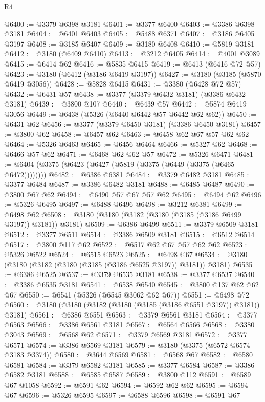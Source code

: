 \begin{lexlean}{R4}
\begin{coremodule}
@6400 := @3379 @6398 @3181
@6401 := @3377 @6400
@6403 := @3386 @6398 @3181
@6404 := @6401 @6403
@6405 := @5488 @6371
@6407 := @3186 @6405 @3197
@6408 := @3185 @6407
@6409 := @3180 @6408
@6410 := @5819 @3181
@6412 := @3180 (@6409 @6410)
@6413 := @3212 @6405
@6414 := @4001 @3089
@6415 := @6414 @62
@6416 := @5835 @6415
@6419 := @6413 (@6416 @72 @57)
@6423 := @3180 (@6412 (@3186 @6419 @3197))
@6427 := @3180 (@3185 (@5870 @6419 @3056))
@6428 := @5828 @6415
@6431 := @3380 (@6428 @72 @57)
@6432 := @6431 @57
@6438 := @3377 (@3379 @6432 @3181) (@3386 @6432 @3181)
@6439 := @3800 @107
@6440 := @6439 @57
@6442 := @5874 @6419 @3056
@6449 := @6438 (@5326 (@6440 @6442 @57 @6442 @62 @62))
@6450 := @6431 @62
@6456 := @3377 (@3379 @6450 @3181) (@3386 @6450 @3181)
@6457 := @3800 @62
@6458 := @6457 @62
@6463 := @6458 @62 @67 @57 @62 @62
@6464 := @5326 @6463
@6465 := @6456 @6464
@6466 := @5327 @62
@6468 := @6466 @57 @62
@6471 := @6468 @62 @62 @57
@6472 := @5326 @6471
@6481 := @6404 (@3375 (@6423 (@6427 (@5819 (@3375 (@6449 (@3375 (@6465 @6472))))))))
@6482 := @6386 @6381
@6484 := @3379 @6482 @3181
@6485 := @3377 @6484
@6487 := @3386 @6482 @3181
@6488 := @6485 @6487
@6490 := @3800 @67 @62
@6494 := @6490 @57 @67 @57 @62
@6495 := @6494 @62
@6496 := @5326 @6495
@6497 := @6488 @6496
@6498 := @3212 @6381
@6499 := @6498 @62
@6508 := @3180 (@3180 (@3182 (@3180 (@3185 (@3186 @6499 @3197)) @3181)) @3181)
@6509 := @6386 @6499
@6511 := @3379 @6509 @3181
@6512 := @3377 @6511
@6514 := @3386 @6509 @3181
@6515 := @6512 @6514
@6517 := @3800 @117 @62
@6522 := @6517 @62 @67 @57 @62 @62
@6523 := @5326 @6522
@6524 := @6515 @6523
@6525 := @6498 @67
@6534 := @3180 (@3180 (@3182 (@3180 (@3185 (@3186 @6525 @3197)) @3181)) @3181)
@6535 := @6386 @6525
@6537 := @3379 @6535 @3181
@6538 := @3377 @6537
@6540 := @3386 @6535 @3181
@6541 := @6538 @6540
@6545 := @3800 @137 @62 @62 @67
@6550 := @6541 (@5326 (@6545 @3062 @62 @67))
@6551 := @6498 @72
@6560 := @3180 (@3180 (@3182 (@3180 (@3185 (@3186 @6551 @3197)) @3181)) @3181)
@6561 := @6386 @6551
@6563 := @3379 @6561 @3181
@6564 := @3377 @6563
@6566 := @3386 @6561 @3181
@6567 := @6564 @6566
@6568 := @3380 @3043
@6569 := @6568 @62
@6571 := @3379 @6569 @3181
@6572 := @3377 @6571
@6574 := @3386 @6569 @3181
@6579 := @3180 (@3375 (@6572 @6574 @3183 @3374))
@6580 := @3644 @6569
@6581 := @6568 @67
@6582 := @6580 @6581
@6584 := @3379 @6582 @3181
@6585 := @3377 @6584
@6587 := @3386 @6582 @3181
@6588 := @6585 @6587
@6589 := @3800 @112
@6591 := @6589 @67 @1058
@6592 := @6591 @62
@6594 := @6592 @62 @62
@6595 := @6594 @67
@6596 := @5326 @6595
@6597 := @6588 @6596
@6598 := @6591 @67

\end{coremodule}
\end{lexlean}
